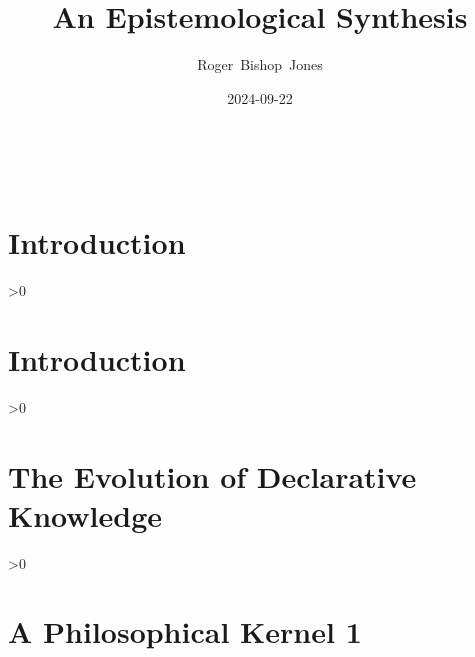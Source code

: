 \documentclass[10pt,titlepage]{book}
\title{\bf\LARGE An Epistemological Synthesis}
\author{Roger~Bishop~Jones}
\date{\small 2024-09-22}
\newcommand{\resetnotes}{%
  \ifnum\value{endnote}>0%
  \theendnotes%
  \setcounter{endnote}{0}%
  \else%
  \fi%
}
\newcommand{\ignore}[1]{}
\begin{document}

%
                               
\begin{titlepage}
\maketitle





\end{titlepage}

\ \

\ignore{
\begin{centering}
{}
\end{centering}
}%

\setcounter{tocdepth}{2}
{\parskip-0pt\tableofcontents}


\chapter{Introduction}



\resetnotes

\chapter{Introduction}



\resetnotes

\chapter{The Evolution of Declarative Knowledge}\label{EDK}



\resetnotes

\chapter{A Philosophical Kernel 1}
\end{document}
